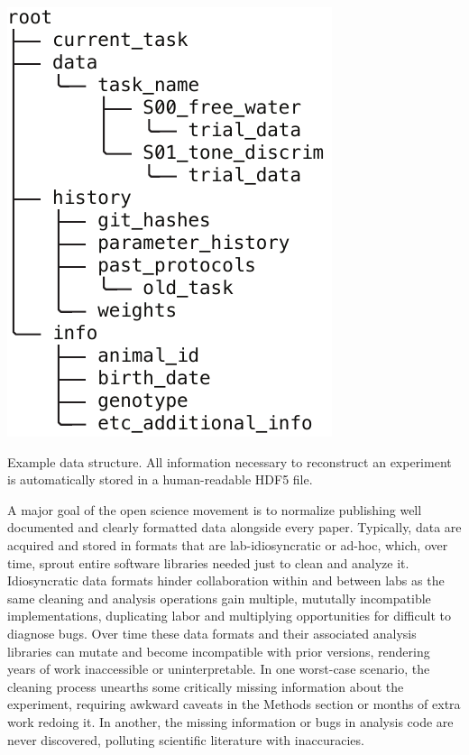 \begin{marginfigure}[1.5cm]
\includegraphics[]{figures/side_16_data.pdf}
\caption{Example data structure. All information necessary to reconstruct an experiment is automatically stored in a human-readable HDF5 file.}
\label{fig:datastx}
\end{marginfigure}

A major goal of the open science movement is to normalize publishing well documented and clearly formatted data alongside every paper. Typically, data are acquired and stored in formats that are lab-idiosyncratic or ad-hoc, which, over time, sprout entire software libraries needed just to clean and analyze it. Idiosyncratic data formats hinder collaboration within and between labs as the same cleaning and analysis operations gain multiple, mututally incompatible implementations, duplicating labor and multiplying opportunities for difficult to diagnose bugs. Over time these data formats and their associated analysis libraries can mutate and become incompatible with prior versions, rendering years of work inaccessible or uninterpretable. In one worst-case scenario, the cleaning process unearths some critically missing information about the experiment, requiring awkward caveats in the Methods section or months of extra work redoing it. In another, the missing information or bugs in analysis code are never discovered, polluting scientific literature with inaccuracies. 

